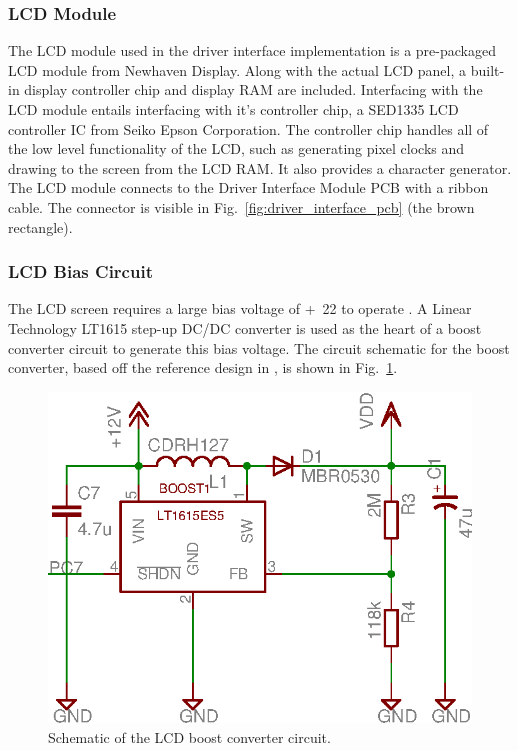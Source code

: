 \subsubsection{LCD Module}

The LCD module used in the driver interface implementation is a pre-packaged LCD module from Newhaven Display. Along with the actual LCD panel, a built-in display controller chip and display RAM are included. Interfacing with the LCD module entails interfacing with it's controller chip, a SED1335 LCD controller IC from Seiko Epson Corporation. The controller chip handles all of the low level functionality of the LCD, such as generating pixel clocks and drawing to the screen from the LCD RAM. It also provides a character generator. The LCD module connects to the Driver Interface Module PCB with a ribbon cable. The connector is visible in Fig.\ \ref{fig:driver_interface_pcb} (the brown rectangle).

\subsubsection{LCD Bias Circuit}

The LCD screen requires a large bias voltage of \unit{+22}{\volt} to operate \cite{LCD_Module}. A Linear Technology LT1615 step-up DC/DC converter is used as the heart of a boost converter circuit to generate this bias voltage. The circuit schematic for the boost converter, based off the reference design in \cite{LCD_Module}, is shown in Fig.\ \ref{fig:lcd_boost_converter}.

\begin{figure}[H]
 \centering
 \includegraphics[scale=0.8]{implementation/figures/driver_interface_lcd_bias_circuit.eps}
 \caption{Schematic of the LCD boost converter circuit.}
 \label{fig:lcd_boost_converter}
\end{figure}

